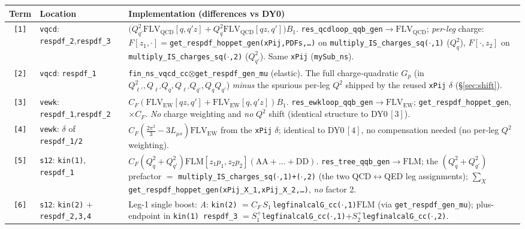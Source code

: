 \documentclass[11pt]{article}
\newcommand{\code}[1]{\texttt{#1}}
\newcommand{\FLM}{\ensuremath{\mathrm{FLM}}}
\newcommand{\FLVQCD}{\ensuremath{\mathrm{FLV}_{\mathrm{QCD}}}}
\newcommand{\FLVEW}{\ensuremath{\mathrm{FLV}_{\mathrm{EW}}}}
\newcommand{\Lms}{\ensuremath{L_{\mu s}}}
\begin{document}
\begin{center}\small
\begin{longtable}{@{}c p{4.7cm} p{8.7cm}@{}}
\toprule
\textbf{Term} & \textbf{Location} & \textbf{Implementation (differences vs DY0)}\\
\midrule\endhead
\code{[1]} & \code{vqcd}: \code{respdf\_2},\code{respdf\_3}
 & $\big(Q_{q'}^2\FLVQCD[q,q'z]+Q_q^2\FLVQCD[qz,q']\big)B_1$.
   \code{res\_qcdloop\_qqb\_gen}$\to\FLVQCD$; \emph{per-leg} charge:
   $F[z_1,\cdot]=$\code{get\_respdf\_hoppet\_gen(xPij,PDFs,\dots)} on
   \code{multiply\_IS\_charges\_sq($\cdot$,1)} ($Q_q^2$), $F[\cdot,z_2]$ on
   \code{multiply\_IS\_charges\_sq($\cdot$,2)} ($Q_{q'}^2$). Same \code{xPij} (\code{mySub\_ns}).\\
\code{[2]} & \code{vqcd}: \code{respdf\_1}
 & \code{fin\_ns\_vqcd\_cc}$\otimes$\code{get\_respdf\_gen\_mu} (elastic). The full
   charge-quadratic $G_p$ (in $Q_{\ell'}^2,Q_{\ell'}Q_q,Q_{\ell'}Q_{q'},Q_qQ_{q'}$) \emph{minus}
   the spurious per-leg $Q^2$ shipped by the reused \code{xPij} $\delta$ (\S\ref{sec:shift}).\\
\code{[3]} & \code{vewk}: \code{respdf\_1},\code{respdf\_2}
 & $C_F(\FLVEW[qz,q']+\FLVEW[q,q'z])B_1$. \code{res\_ewkloop\_qqb\_gen}$\to\FLVEW$;
   \code{get\_respdf\_hoppet\_gen}, $\times C_F$. \emph{No} charge weighting and \emph{no} $Q^2$
   shift (identical structure to DY0\,$[3]$).\\
\code{[4]} & \code{vewk}: $\delta$ of \code{respdf\_1/2}
 & $C_F(\tfrac{2\pi^2}{3}-3\Lms)\FLVEW$ from the \code{xPij} $\delta$; identical to DY0\,$[4]$,
   no compensation needed (no per-leg $Q^2$ weighting).\\
\code{[5]} & \code{s12}: \code{kin(1)}, \code{respdf\_1}
 & $C_F(Q_q^2+Q_{q'}^2)\FLM[z_1p_1,z_2p_2](\mathrm{AA}{+}\dots{+}\mathrm{DD})$.
   \code{res\_tree\_qqb\_gen}$\to\FLM$; the $(Q_q^2{+}Q_{q'}^2)$ prefactor $=$
   \code{multiply\_IS\_charges\_sq($\cdot$,1)+($\cdot$,2)} (the two QCD$\leftrightarrow$QED leg
   assignments); $\sum_X$\code{get\_respdf\_hoppet\_gen(xPij\_X\_1,xPij\_X\_2,\dots)}, \emph{no}
   factor 2.\\
\code{[6]} & \code{s12}: \code{kin(2)} $+$ \code{respdf\_2,3,4}
 & Leg-1 single boost:\newline
   \emph{A}: \code{kin(2)} $=C_F\,S_1\,$\code{legfinalcalG\_cc($\cdot$,1)}$\FLM$ (via
   \code{get\_respdf\_gen\_mu}); plus-endpoint in \code{kin(1) respdf\_3}
   $=S_1^+$\code{legfinalcalG\_cc($\cdot$,1)}$+S_2^+$\code{legfinalcalG\_cc($\cdot$,2)}.\newline

\end{longtable}
\end{center}
\end{document}
